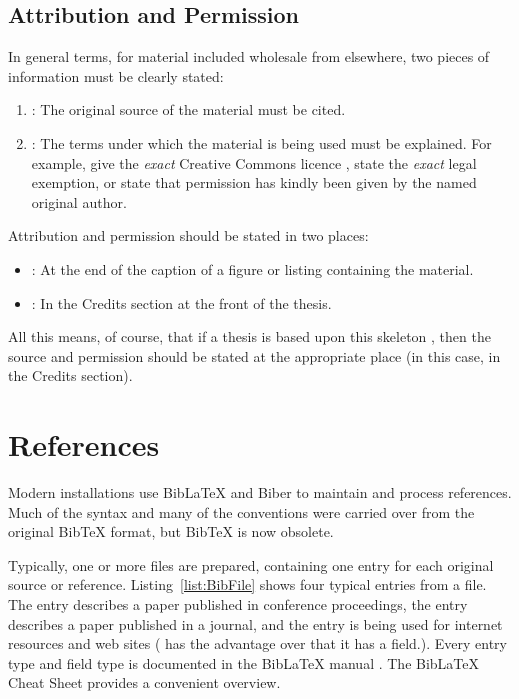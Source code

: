 \subsection{Attribution and Permission}

In general terms, for material included wholesale from elsewhere, two
pieces of information must be clearly stated:
\begin{enumerate}
      \item {}: The original source of the material must
            be cited.

      \item {}: The terms under which the material is
            being used must be explained. For example, give the \emph{exact}
            Creative Commons licence \parencite{CC-Licences}, state the
            \emph{exact} legal exemption, or state that permission has kindly
            been given by the named original author.
\end{enumerate}

Attribution and permission should be stated in two places:
\begin{itemize}
      \item {}: At the end of the caption of a figure
            or listing containing the material.

      \item {}: In the Credits section at the
            front of the thesis.
\end{itemize}

All this means, of course, that if a thesis is based upon this
skeleton \parencite{KeithThesis}, then the source and permission
should be stated at the appropriate place (in this case, in the
Credits section).







\section{References}

Modern \LaTeXe installations use BibLaTeX \parencite{BibLaTeX} and
Biber \parencite{Biber} to maintain and process references. Much of
the syntax and many of the conventions were carried over from the
original BibTeX \parencite{BibTeX} format, but BibTeX is now obsolete.

Typically, one or more  files are prepared, containing one
entry for each original source or reference.
Listing~\ref{list:BibFile} shows four typical entries from a
 file. The  entry describes a paper
published in conference proceedings, the  entry
describes a paper published in a journal, and the 
entry is being used for internet resources and web sites
( has the advantage over  that it has a
 field.). Every entry type and field type is
documented in the BibLaTeX manual \parencite{BibLaTeX}. The BibLaTeX
Cheat Sheet \parencite{Biblatex-Cheatsheet} provides a convenient
overview.


